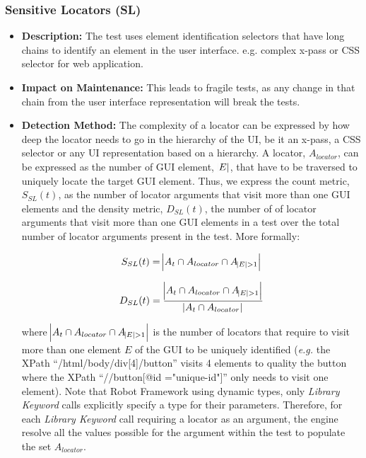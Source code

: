 \subsubsection{Sensitive Locators (SL)}

\begin{itemize}
    \item \textbf{Description:} The test uses element identification selectors that have long chains to identify an element in the user interface. e.g. complex x-pass or CSS selector for web application.

    \item \textbf{Impact on Maintenance:} This leads to fragile tests, as any change in that chain from the user interface representation will break the tests.
    
    \item \textbf{Detection Method:} The complexity of a locator can be expressed by how deep the locator needs to go in the hierarchy of the UI, be it an x-pass, a CSS selector or any UI representation based on a hierarchy. A locator, $A_{locator}$, can be expressed as the number of GUI element, $\abs{E}$, that have to be traversed to uniquely locate the target GUI element. Thus, we express the count metric, $S_{SL}(t)$, as the number of locator arguments that visit more than one GUI elements and the density metric, $D_{SL}(t)$, the number of of locator arguments that visit more than one GUI elements in a test over the total number of locator arguments present in the test. More formally:
    
    \begin{equation*}
        S_{SL}(t) = \abs{A_t \cap A_{locator} \cap A_{\abs{E} > 1}}
    \end{equation*}
    
    \begin{equation*}
        D_{SL}(t) = \frac{\abs{A_t \cap A_{locator} \cap A_{\abs{E} > 1}}}{\abs{A_t \cap A_{locator}}}
    \end{equation*}
    
    where $\abs{A_t \cap A_{locator} \cap A_{\abs{E} > 1}}$ is the number of locators that require to visit more than one element $E$ of the GUI to be uniquely identified (\emph{e.g.} the XPath ``/html/body/div[4]/button'' visits 4 elements to quality the button where the XPath ``//button[@id ="unique-id"]'' only needs to visit one element). Note that Robot Framework using dynamic types, only \emph{Library Keyword} calls explicitly specify a type for their parameters. Therefore, for each \emph{Library Keyword} call requiring a locator as an argument, the engine resolve all the values possible for the argument within the test to populate the set $A_{locator}$.
    

\end{itemize}

